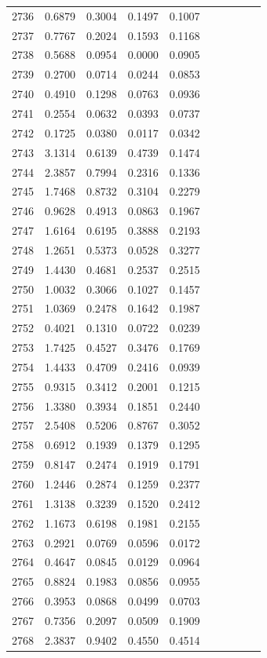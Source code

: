 \begin{table}
\begin{tabular}{cccccccccc}
2736& 0.6879& 0.3004& 0.1497& 0.1007\\ 
2737& 0.7767& 0.2024& 0.1593& 0.1168\\ 
2738& 0.5688& 0.0954& 0.0000& 0.0905\\ 
2739& 0.2700& 0.0714& 0.0244& 0.0853\\ 
2740& 0.4910& 0.1298& 0.0763& 0.0936\\ 
2741& 0.2554& 0.0632& 0.0393& 0.0737\\ 
2742& 0.1725& 0.0380& 0.0117& 0.0342\\ 
2743& 3.1314& 0.6139& 0.4739& 0.1474\\ 
2744& 2.3857& 0.7994& 0.2316& 0.1336\\ 
2745& 1.7468& 0.8732& 0.3104& 0.2279\\ 
2746& 0.9628& 0.4913& 0.0863& 0.1967\\ 
2747& 1.6164& 0.6195& 0.3888& 0.2193\\ 
2748& 1.2651& 0.5373& 0.0528& 0.3277\\ 
2749& 1.4430& 0.4681& 0.2537& 0.2515\\ 
2750& 1.0032& 0.3066& 0.1027& 0.1457\\ 
2751& 1.0369& 0.2478& 0.1642& 0.1987\\ 
2752& 0.4021& 0.1310& 0.0722& 0.0239\\ 
2753& 1.7425& 0.4527& 0.3476& 0.1769\\ 
2754& 1.4433& 0.4709& 0.2416& 0.0939\\ 
2755& 0.9315& 0.3412& 0.2001& 0.1215\\ 
2756& 1.3380& 0.3934& 0.1851& 0.2440\\ 
2757& 2.5408& 0.5206& 0.8767& 0.3052\\ 
2758& 0.6912& 0.1939& 0.1379& 0.1295\\ 
2759& 0.8147& 0.2474& 0.1919& 0.1791\\ 
2760& 1.2446& 0.2874& 0.1259& 0.2377\\ 
2761& 1.3138& 0.3239& 0.1520& 0.2412\\ 
2762& 1.1673& 0.6198& 0.1981& 0.2155\\ 
2763& 0.2921& 0.0769& 0.0596& 0.0172\\ 
2764& 0.4647& 0.0845& 0.0129& 0.0964\\ 
2765& 0.8824& 0.1983& 0.0856& 0.0955\\ 
2766& 0.3953& 0.0868& 0.0499& 0.0703\\ 
2767& 0.7356& 0.2097& 0.0509& 0.1909\\ 
2768& 2.3837& 0.9402& 0.4550& 0.4514\\ 

\end{tabular}
\end{table}
